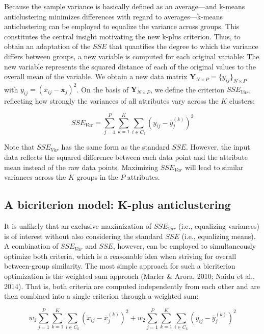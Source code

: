 \documentclass[
  man,floatsintext]{apa7}
\begin{document}
Because the sample variance is basically defined as an average---and k-means anticlustering minimizes differences with regard to averages---k-means anticlustering can be employed to equalize the variance across groups. This constitutes the central insight motivating the new k-plus criterion. Thus, to obtain an adaptation of the \(\mathit{SSE}\) that quantifies the degree to which the variance differs between groups, a new variable is computed for each original variable: The new variable represents the squared distance of each of the original values to the overall mean of the variable. We obtain a new data matrix \(\mathbf{Y}_{N \times P} = \{y_{ij}\}_{N \times P}\) with \(y_{ij} = (x_{ij} - \overline{\mathbf{x}}_j)^2\). On the basis of \(\mathbf{Y}_{N \times P}\), we define the criterion \(\mathit{SSE_{Var}}\), reflecting how strongly the variances of all attributes vary across the \(K\) clusters:

\[
\mathit{SSE_{Var}} = 
  \sum\limits_{j=1}^{P} 
  \sum\limits_{k=1}^{K} 
  \sum\limits_{i \in C_k}
  (y_{ij} - \overline{y}_j ^{(k)})^2
\]

Note that \(\mathit{SSE_{Var}}\) has the same form as the standard \(\mathit{SSE}\). However, the input data reflects the squared difference between each data point and the attribute mean instead of the raw data points. Maximizing \(\mathit{SSE_{Var}}\) will lead to similar variances across the \(K\) groups in the \(P\) attributes.

\hypertarget{kplus}{%
\subsection{A bicriterion model: K-plus anticlustering}\label{kplus}}

It is unlikely that an exclusive maximization of \(\mathit{SSE_{Var}}\) (i.e., equalizing variances) is of interest without also considering the standard \(\mathit{SSE}\) (i.e., equalizing means). A combination of \(\mathit{SSE_{Var}}\) and \(\mathit{SSE}\), however, can be employed to simultaneously optimize both criteria, which is a reasonable idea when striving for overall between-group similarity. The most simple approach for such a bicriterion optimization is the weighted sum approach (Marler \& Arora, 2010; Naidu et al., 2014). That is, both criteria are computed independently from each other and are then combined into a single criterion through a weighted sum:

\[
w_1 \sum\limits_{j=1}^{P} 
  \sum\limits_{k=1}^{K} 
  \sum\limits_{i \in C_k}
  (x_{ij} - \overline{x}_j ^{(k)})^2 + 
w_2 \sum\limits_{j=1}^{P} 
  \sum\limits_{k=1}^{K} 
  \sum\limits_{i \in C_k}
  (y_{ij} - \overline{y}_j ^{(k)})^2
\]
\end{document}
